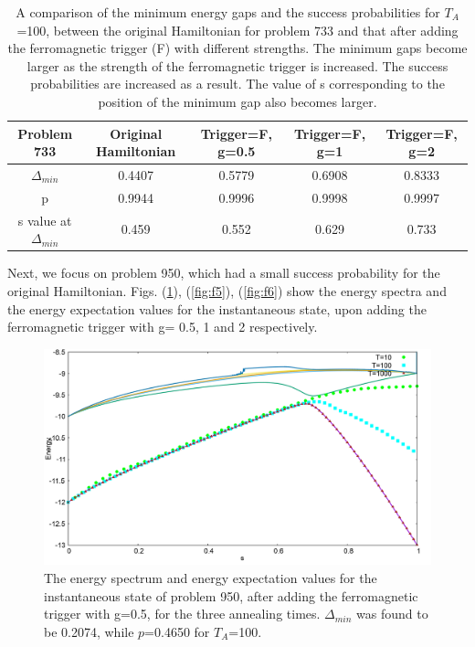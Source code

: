 \documentclass[../main.tex]{subfiles}
\begin{document}
\begin{table}[H]
\centering
\renewcommand{\arraystretch}{1.3}
\begin{tabular}{|c|c|c|c|c|}
\hline 
Problem 733 & Original Hamiltonian & Trigger=F, g=0.5 & Trigger=F, g=1 & Trigger=F, g=2 \\ 
\hline 
$\Delta_{min}$ & 0.4407 & 0.5779 & 0.6908 & 0.8333 \\ 
\hline 
p & 0.9944 & 0.9996 & 0.9998 & 0.9997 \\ 
\hline 
s value at $\Delta_{min}$ & 0.459 & 0.552 & 0.629 & 0.733 \\
\hline

\end{tabular} 
\caption{A comparison of the minimum energy gaps and the success probabilities for $T_A$=100, between the original Hamiltonian for problem 733 and that after adding the ferromagnetic trigger (F) with different strengths. The minimum gaps become larger as the strength of the ferromagnetic trigger is increased. The success probabilities are increased as a result. The value of s corresponding to the position of the minimum gap also becomes larger.}
\label{tab:f1}
\end{table}

Next, we focus on problem 950, which had a small success probability for the original Hamiltonian. Figs. (\ref{fig:f4}), (\ref{fig:f5}), (\ref{fig:f6}) show the energy spectra and the energy expectation values for the instantaneous state, upon adding the ferromagnetic trigger with g= 0.5, 1 and 2 respectively. 
\begin{figure}[H]
\centering 
\includegraphics[scale=0.24]{950_s12_F_g0.png}
\caption{The energy spectrum and energy expectation values for the instantaneous state of problem 950, after adding the ferromagnetic trigger with g=0.5, for the three annealing times. $\Delta_{min}$ was found to be 0.2074, while $p$=0.4650 for $T_A$=100.}
\label{fig:f4}
\end{figure}
\end{document}
